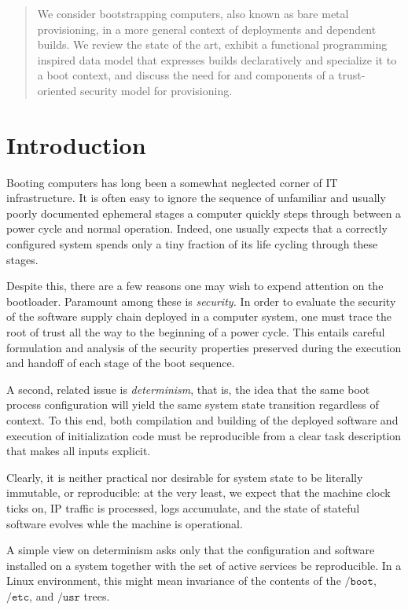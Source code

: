 \maketitle


\begin{abstract}

  We consider bootstrapping computers, also known as bare metal provisioning, in a more general context of deployments and dependent builds. We review the state of the art, exhibit a functional programming inspired data model that expresses builds declaratively and specialize it to a boot context, and discuss the need for and components of a trust-oriented security model for provisioning.

\end{abstract}

\section{Introduction}

Booting computers has long been a somewhat neglected corner of IT infrastructure. 
%
It is often easy to ignore the sequence of unfamiliar and usually poorly documented ephemeral stages a computer quickly steps through between a power cycle and normal operation. 
%
Indeed, one usually expects that a correctly configured system spends only a tiny fraction of its life cycling through these stages.

Despite this, there are a few reasons one may wish to expend attention on the bootloader. 
%
Paramount among these is \emph{security.} 
%
In order to evaluate the security of the software supply chain deployed in a computer system, one must trace the root of trust all the way to the beginning of a power cycle.
%
This entails careful formulation and analysis of the security properties preserved during the execution and handoff of each stage of the boot sequence.

A second, related issue is \emph{determinism}, that is, the idea that the same boot process configuration will yield the same system state transition regardless of context.
%
To this end, both compilation and building of the deployed software and execution of initialization code must be reproducible from a clear task description that makes all inputs explicit.

\begin{remark}
  
  Clearly, it is neither practical nor desirable for system state to be literally immutable, or reproducible: at the very least, we expect that the machine clock ticks on, IP traffic is processed, logs accumulate, and the state of stateful software evolves whle the machine is operational.

  A simple view on determinism asks only that the configuration and software installed on a system together with the set of active services be reproducible.
  In a Linux environment, this might mean invariance of the contents of the $\mathtt{/boot}$, $\mathtt{/etc}$, and $\mathtt{/usr}$ trees.

\end{remark}

